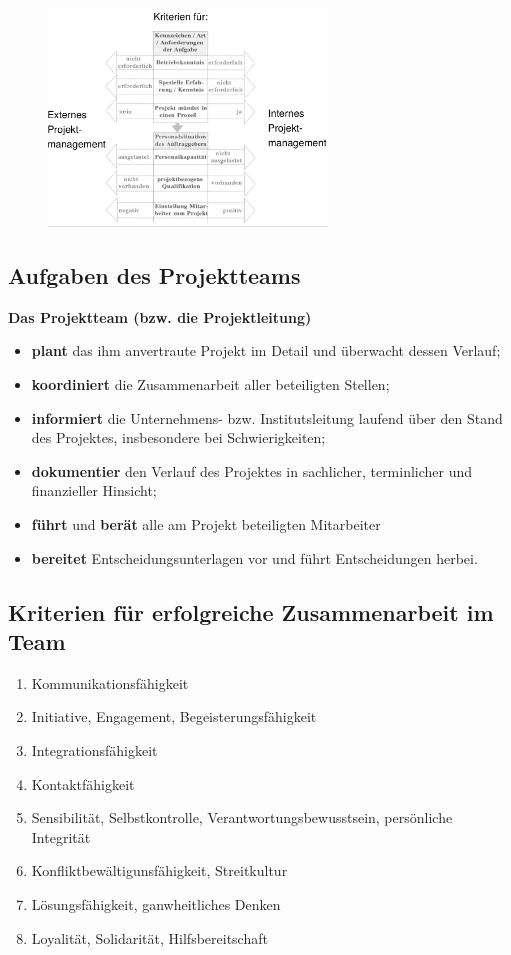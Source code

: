 \documentclass[11pt,a4paper]{article}
\begin{document}
\begin{figure}[H]
	\centering

	\includegraphics[width=0.66\textwidth]{ch5/kriterien}

\end{figure}	



\subsection{Aufgaben des Projektteams}
\textbf{Das Projektteam (bzw. die Projektleitung)}

\begin{itemize}
\item \textbf{plant} das ihm anvertraute Projekt im Detail und überwacht dessen Verlauf;
\item \textbf{koordiniert} die Zusammenarbeit aller beteiligten Stellen;
\item \textbf{informiert} die Unternehmens- bzw. Institutsleitung laufend über den Stand
des Projektes, insbesondere bei Schwierigkeiten;
\item \textbf{dokumentier} den Verlauf des Projektes in sachlicher, terminlicher und
finanzieller Hinsicht;
\item \textbf{führt} und \textbf{berät} alle am Projekt beteiligten Mitarbeiter
\item \textbf{bereitet} Entscheidungsunterlagen vor und führt Entscheidungen herbei.
\end{itemize}

\subsection{Kriterien für erfolgreiche Zusammenarbeit im Team}
\begin{enumerate}
\item Kommunikationsfähigkeit
\item Initiative, Engagement, Begeisterungsfähigkeit
\item Integrationsfähigkeit
\item Kontaktfähigkeit
\item Sensibilität, Selbstkontrolle, Verantwortungsbewusstsein, persönliche Integrität
\item Konfliktbewältigunsfähigkeit, Streitkultur
\item Lösungsfähigkeit, ganwheitliches Denken
\item Loyalität, Solidarität, Hilfsbereitschaft
\end{enumerate}
\end{document}
